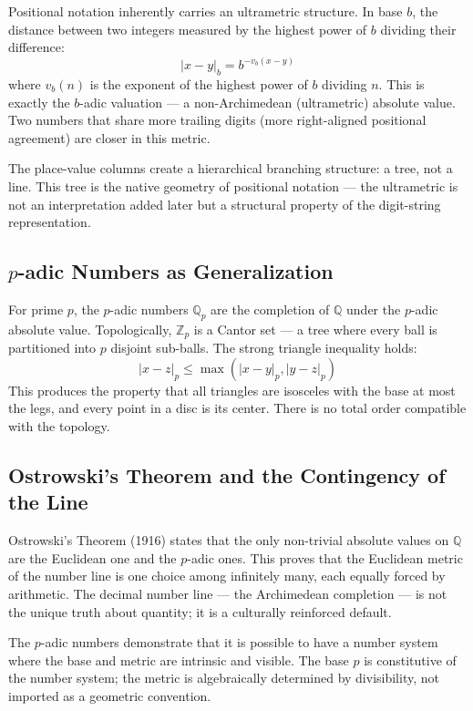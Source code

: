 \documentclass[12pt,a4paper]{article}
\theoremstyle{definition}
\theoremstyle{remark}
\newcommand{\Q}{\mathbb{Q}}
\newcommand{\Qp}{\mathbb{Q}_p}
\newcommand{\Zp}{\mathbb{Z}_p}
\newcommand{\abs}[1]{|#1|}
\begin{document}
Positional notation inherently carries an ultrametric structure. In base $b$, the
distance between two integers measured by the highest power of $b$ dividing their
difference:
\[
\abs{x - y}_b = b^{-v_b(x-y)}
\]
where $v_b(n)$ is the exponent of the highest power of $b$ dividing $n$. This is
exactly the $b$-adic valuation --- a non-Archimedean (ultrametric) absolute value.
Two numbers that share more trailing digits (more right-aligned positional
agreement) are closer in this metric.

The place-value columns create a hierarchical branching structure: a tree, not a
line. This tree is the native geometry of positional notation --- the ultrametric
is not an interpretation added later but a structural property of the digit-string
representation.

\subsection{$p$-adic Numbers as Generalization}

For prime $p$, the $p$-adic numbers $\Qp$ are the completion of $\Q$ under the
$p$-adic absolute value. Topologically, $\Zp$ is a Cantor set --- a tree where
every ball is partitioned into $p$ disjoint sub-balls. The strong triangle
inequality holds:
\[
\abs{x - z}_p \leq \max(\abs{x - y}_p, \abs{y - z}_p)
\]
This produces the property that all triangles are isosceles with the base at most
the legs, and every point in a disc is its center. There is no total order
compatible with the topology.

\subsection{Ostrowski's Theorem and the Contingency of the Line}

Ostrowski's Theorem (1916) states that the only non-trivial absolute values on $\Q$
are the Euclidean one and the $p$-adic ones. This proves that the Euclidean metric
of the number line is one choice among infinitely many, each equally forced by
arithmetic. The decimal number line --- the Archimedean completion --- is not the
unique truth about quantity; it is a culturally reinforced default.

The $p$-adic numbers demonstrate that it is possible to have a number system where
the base and metric are intrinsic and visible. The base $p$ is constitutive of the
number system; the metric is algebraically determined by divisibility, not imported
as a geometric convention.
\end{document}
